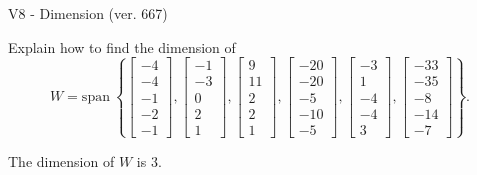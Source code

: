 \begin{exercise}
  \begin{exerciseTitle}V8 - Dimension (ver. 667)\end{exerciseTitle}
  \begin{exerciseStatement}
    Explain how to find the dimension of 
\[W=\mathrm{span}\ \left\{\left[\begin{array}{r}
-4 \\
-4 \\
-1 \\
-2 \\
-1
\end{array}\right] , \left[\begin{array}{r}
-1 \\
-3 \\
0 \\
2 \\
1
\end{array}\right] , \left[\begin{array}{r}
9 \\
11 \\
2 \\
2 \\
1
\end{array}\right] , \left[\begin{array}{r}
-20 \\
-20 \\
-5 \\
-10 \\
-5
\end{array}\right] , \left[\begin{array}{r}
-3 \\
1 \\
-4 \\
-4 \\
3
\end{array}\right] , \left[\begin{array}{r}
-33 \\
-35 \\
-8 \\
-14 \\
-7
\end{array}\right]\right\}.\]



  \end{exerciseStatement}
  \begin{exerciseAnswer}
   The dimension of \(W\) is  \(3\).
  


  \end{exerciseAnswer}
\end{exercise}